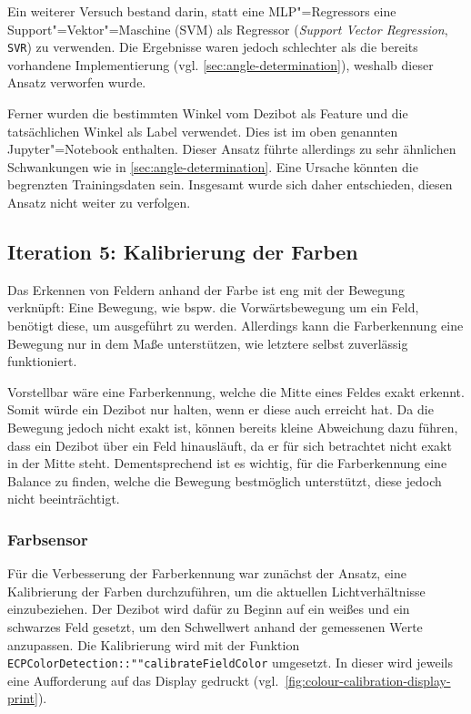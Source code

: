 Ein weiterer Versuch bestand darin, statt eine MLP"=Regressors eine Support"=Vektor"=Maschine (SVM) als Regressor (\emph{Support Vector Regression}, \texttt{SVR}) zu verwenden. Die Ergebnisse waren jedoch schlechter als die bereits vorhandene Implementierung (vgl. \autoref{sec:angle-determination}), weshalb dieser Ansatz verworfen wurde. 

Ferner wurden die bestimmten Winkel vom Dezibot als Feature und die tatsächlichen Winkel als Label verwendet. Dies ist im oben genannten Jupyter"=Notebook enthalten. Dieser Ansatz führte allerdings zu sehr ähnlichen Schwankungen wie in \autoref{sec:angle-determination}. Eine Ursache könnten die begrenzten Trainingsdaten sein. Insgesamt wurde sich daher entschieden, diesen Ansatz nicht weiter zu verfolgen.


\subsection{Iteration 5: Kalibrierung der Farben}
\label{sec:colour-calibration}

Das Erkennen von Feldern anhand der Farbe ist eng mit der Bewegung verknüpft: Eine Bewegung, wie bspw. die Vorwärtsbewegung um ein Feld, benötigt diese, um ausgeführt zu werden. Allerdings kann die Farberkennung eine Bewegung nur in dem Maße unterstützen, wie letztere selbst zuverlässig funktioniert.

Vorstellbar wäre eine Farberkennung, welche die Mitte eines Feldes exakt erkennt. Somit würde ein Dezibot nur halten, wenn er diese auch erreicht hat. Da die Bewegung jedoch nicht exakt ist, können bereits kleine Abweichung dazu führen, dass ein Dezibot über ein Feld hinausläuft, da er für sich betrachtet nicht exakt in der Mitte steht. Dementsprechend ist es wichtig, für die Farberkennung eine Balance zu finden, welche die Bewegung bestmöglich unterstützt, diese jedoch nicht beeinträchtigt.


\subsubsection{Farbsensor}
\label{sec:colour-calibration-colour-sensor}

Für die Verbesserung der Farberkennung war zunächst der Ansatz, eine Kalibrierung der Farben durchzuführen, um die aktuellen Lichtverhältnisse einzubeziehen. Der Dezibot wird dafür zu Beginn auf ein weißes und ein schwarzes Feld gesetzt, um den Schwellwert anhand der gemessenen Werte anzupassen. Die Kalibrierung wird mit der Funktion \texttt{ECP\-Color\-Detection::""calibrate\-Field\-Color} umgesetzt. In dieser wird jeweils eine Aufforderung auf das Display gedruckt (vgl.~\autoref{fig:colour-calibration-display-print}).

